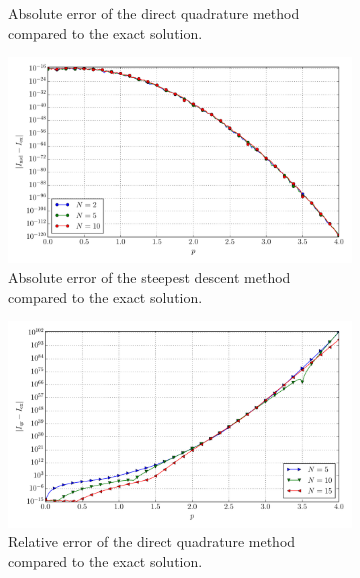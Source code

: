 \documentclass[a4paper,10pt]{article}
\begin{document}
\begin{figure}[ht!]
\begin{subfigure}[t]{0.5\linewidth}
    \caption{Absolute error of the direct quadrature method compared to the exact solution.}
    \label{fig:tp_4d_conv_p_1111_1111_err_qr}
  \end{subfigure}
  \begin{subfigure}[t]{0.5\linewidth}
    \includegraphics[width=\linewidth]{./plots/tp_4d_conv_p_(1,1,1,1)_(1,1,1,1)_err_nsd.pdf}
    \caption{Absolute error of the steepest descent method compared to the exact solution.}
    \label{fig:tp_4d_conv_p_1111_1111_err_nsd}
  \end{subfigure}
  \begin{subfigure}[t]{0.5\linewidth}
    \includegraphics[width=\linewidth]{./plots/tp_4d_conv_p_(1,1,1,1)_(1,1,1,1)_err_rel_qr.pdf}
    \caption{Relative error of the direct quadrature method compared to the exact solution.}
    \label{fig:tp_4d_conv_p_1111_1111_err_rel_qr}
  \end{subfigure}
  \begin{subfigure}[t]{0.5\linewidth}

\end{subfigure}
\end{figure}
\end{document}
